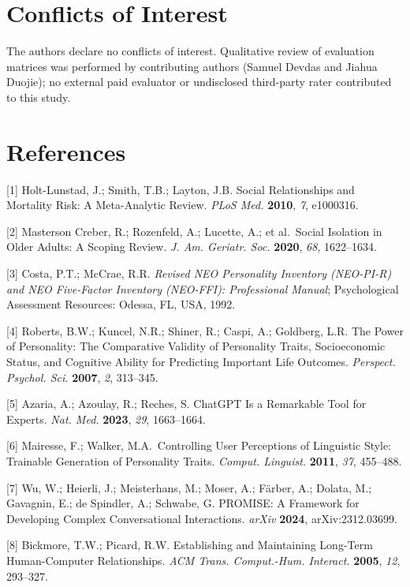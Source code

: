 \documentclass[apajournal,article,submit,moreauthors]{Definitions/mdpi}
\begin{document}
\section{Conflicts of Interest}\label{conflicts-of-interest}

The authors declare no conflicts of interest. Qualitative review of evaluation matrices was performed by contributing authors (Samuel Devdas and Jiahua Duojie); no external paid evaluator or undisclosed third-party rater contributed to this study.

\section{References}\label{references}


{[}1{]} Holt-Lunstad, J.; Smith, T.B.; Layton, J.B. Social Relationships and Mortality Risk: A Meta-Analytic Review. \emph{PLoS Med.} \textbf{2010}, \emph{7}, e1000316.

{[}2{]} Masterson Creber, R.; Rozenfeld, A.; Lucette, A.; et al.~Social Isolation in Older Adults: A Scoping Review. \emph{J. Am. Geriatr. Soc.} \textbf{2020}, \emph{68}, 1622--1634.

{[}3{]} Costa, P.T.; McCrae, R.R. \emph{Revised NEO Personality Inventory (NEO-PI-R) and NEO Five-Factor Inventory (NEO-FFI): Professional Manual}; Psychological Assessment Resources: Odessa, FL, USA, 1992.

{[}4{]} Roberts, B.W.; Kuncel, N.R.; Shiner, R.; Caspi, A.; Goldberg, L.R. The Power of Personality: The Comparative Validity of Personality Traits, Socioeconomic Status, and Cognitive Ability for Predicting Important Life Outcomes. \emph{Perspect. Psychol. Sci.} \textbf{2007}, \emph{2}, 313--345.

{[}5{]} Azaria, A.; Azoulay, R.; Reches, S. ChatGPT Is a Remarkable Tool for Experts. \emph{Nat. Med.} \textbf{2023}, \emph{29}, 1663--1664.

{[}6{]} Mairesse, F.; Walker, M.A.~Controlling User Perceptions of Linguistic Style: Trainable Generation of Personality Traits. \emph{Comput. Linguist.} \textbf{2011}, \emph{37}, 455--488.

{[}7{]} Wu, W.; Heierli, J.; Meisterhans, M.; Moser, A.; Färber, A.; Dolata, M.; Gavagnin, E.; de Spindler, A.; Schwabe, G. PROMISE: A Framework for Developing Complex Conversational Interactions. \emph{arXiv} \textbf{2024}, arXiv:2312.03699.

{[}8{]} Bickmore, T.W.; Picard, R.W. Establishing and Maintaining Long-Term Human-Computer Relationships. \emph{ACM Trans. Comput.-Hum. Interact.} \textbf{2005}, \emph{12}, 293--327.
\end{document}

